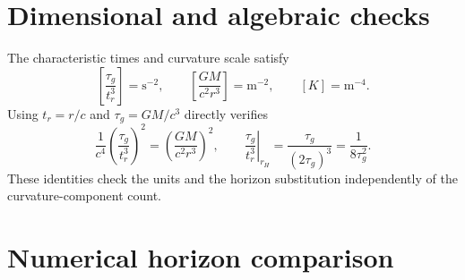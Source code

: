 \documentclass[12pt]{article}
\begin{document}
\section{Dimensional and algebraic checks}
\label{app:checks}

The characteristic times and curvature scale satisfy
\begin{equation}
  \left[\frac{\tau_g}{t_r^3}\right]=\mathrm{s^{-2}},
  \qquad
  \left[\frac{GM}{c^2r^3}\right]=\mathrm{m^{-2}},
  \qquad
  [K]=\mathrm{m^{-4}}.
  \label{eq:dimensions}
\end{equation}
Using $t_r=r/c$ and $\tau_g=GM/c^3$ directly verifies
\begin{equation}
  \frac{1}{c^4}\left(\frac{\tau_g}{t_r^3}\right)^2
  =\left(\frac{GM}{c^2r^3}\right)^2,
  \qquad
  \left.\frac{\tau_g}{t_r^3}\right|_{r_H}
  =\frac{\tau_g}{(2\tau_g)^3}
  =\frac{1}{8\tau_g^2}.
  \label{eq:checks}
\end{equation}
These identities check the units and the horizon substitution independently of the curvature-component count.

\section{Numerical horizon comparison}
\label{app:numerical-comparison}
\end{document}
